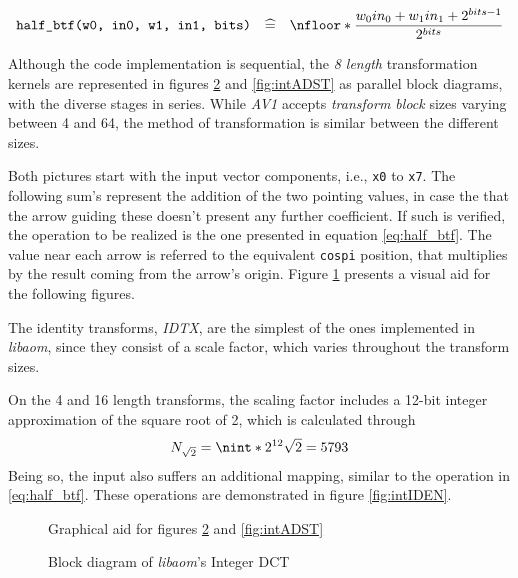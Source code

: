 \begin{equation} \label{eq:half_btf}
    \texttt{half\_btf(w0, in0, w1, in1, bits)} \quad \widehat{=} \quad \nfloor*{\frac{w_0in_0 + w_1in_1 + 2^{bits -1}}{2^{bits}}}
\end{equation}

Although the code implementation is sequential, the \emph{8 length} transformation kernels are represented in figures \ref{fig:intDCT} and \ref{fig:intADST} as parallel block diagrams, with the diverse stages in series. While \emph{AV1} accepts \emph{transform block} sizes varying between 4 and 64, the method of transformation is similar between the different sizes.

Both pictures start with the input vector components, i.e., \texttt{x0} to \texttt{x7}. The following sum's represent the addition of the two pointing values, in case the that the arrow guiding these doesn't present any further coefficient. If such is verified, the operation to be realized is the one presented in equation \ref{eq:half_btf}. The value near each arrow is referred to the equivalent \texttt{cospi} position, that multiplies by the result coming from the arrow's origin. Figure \ref{fig:aid} presents a visual aid for the following figures.

The identity transforms, \emph{IDTX}, are the simplest of the ones implemented in \emph{libaom}, since they consist of a scale factor, which varies throughout the transform sizes.

On the 4 and 16 length transforms, the scaling factor includes a 12-bit integer approximation of the square root of 2, which is calculated through
\begin{equation}
    N_{\sqrt{2}}=\nint*{2^{12}\sqrt{2}}=5793
\end{equation}
Being so, the input also suffers an additional mapping, similar to the operation in \ref{eq:half_btf}. These operations are demonstrated in figure \ref{fig:intIDEN}.

\begin{figure}[!htbp]
    \centering
    
    \caption{Graphical aid for figures \ref{fig:intDCT} and \ref{fig:intADST}}
    \label{fig:aid}
\end{figure}

\begin{figure}[!htbp]
    \centering
    
    \caption{Block diagram of \emph{libaom}'s Integer DCT}
    \label{fig:intDCT}
\end{figure}

